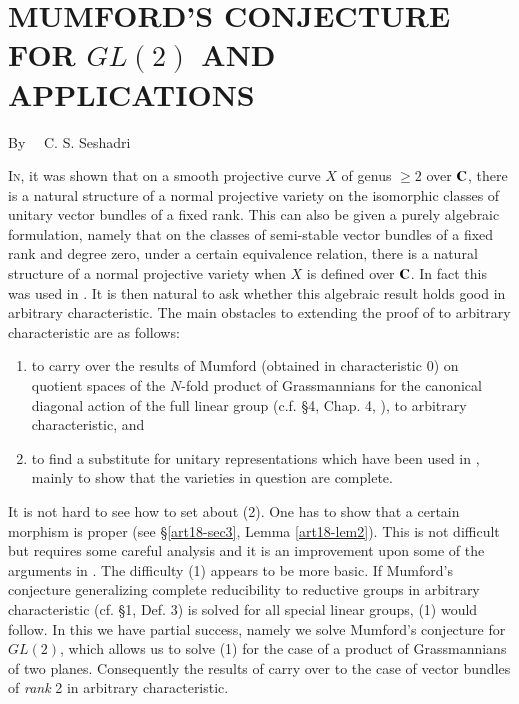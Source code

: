\chapter[\textsc{C. S. Seshadri~:} Mumford's Conjecture for $GL(2)$ and Applications]{MUMFORD'S CONJECTURE FOR $GL(2)$ AND APPLICATIONS}\label{art18}

\begin{center}
By~~ C. S. Seshadri
\end{center}


\setcounter{pageoriginal}{346}
\textsc{In}\pageoriginale \cite{art18-key12}, it was shown that on a smooth projective curve $X$ of genus $\geq 2$ over $\mathbf{C}$, there is a natural structure of a normal projective variety on the isomorphic classes of unitary vector bundles of a fixed rank. This can also be given a purely algebraic formulation, namely that on the classes of semi-stable vector bundles of a fixed rank and degree zero, under a certain equivalence relation, there is a natural structure of a normal projective variety when $X$ is defined over $\mathbf{C}$. In fact this was used in \cite{art18-key12}. It is then natural to ask whether this algebraic result holds good in arbitrary characteristic. The main obstacles to extending the proof of \cite{art18-key12} to arbitrary characteristic are as follows:
\begin{enumerate}
\renewcommand{\labelenumi}{(\theenumi)}
\item to carry over the results of Mumford (obtained in characteristic 0) on quotient spaces of the $N$-fold product of Grassmannians for the canonical diagonal action of the full linear group (c.f. \S4, Chap. 4, \cite{art18-key5}), to arbitrary characteristic, and

\item to find a substitute for unitary representations which have been used in \cite{art18-key12}, mainly to show that the varieties in question are complete.
\end{enumerate}

It is not hard to see how to set about (2). One has to show that a certain morphism is proper (see \S\ref{art18-sec3}, Lemma \ref{art18-lem2}). This is not difficult but requires some careful analysis and it is an improvement upon some of the arguments in \cite{art18-key12}. The difficulty (1) appears to be more basic. If Mumford's conjecture generalizing complete reducibility to reductive groups in arbitrary characteristic (cf. \S1, Def. 3) is solved for all special linear groups, (1) would follow. In this we have partial success, namely we solve Mumford's conjecture for $GL(2)$, which allows us to solve (1) for the case of a product of Grassmannians of two planes. Consequently the results of \cite{art18-key12} carry over to the case of vector bundles of {\em rank} 2 in arbitrary characteristic.

